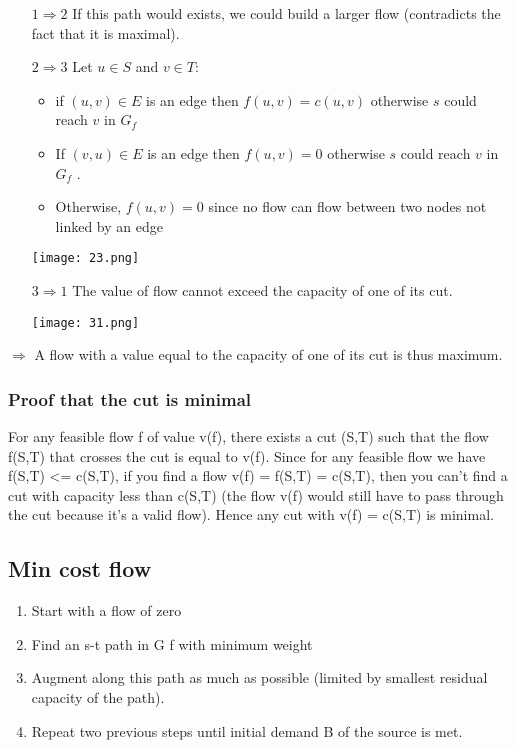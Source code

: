 \begin{itemize}
    \item[$1\Rightarrow2$] If this path would exists, we could build a
        larger flow (contradicts the fact that it is maximal).

    \item[$2\Rightarrow3$] Let $u \in S$ and $v\in T$:
        \begin{itemize}
            \item if $(u, v) \in E$ is an edge then $f(u, v) = c(u, v)$
                otherwise $s$ could reach $v$ in $G_f$ 
            \item If $(v, u) \in E$ is an edge then $f(u, v) = 0$
                otherwise $s$ could reach $v$ in $G_f$ .
            \item Otherwise, $f(u, v) = 0$ since no flow can flow between
                two nodes not linked by an edge
        \end{itemize}
        \begin{center}
    \texttt{[image: 23.png]}
    \end{center}

    \item[$3\Rightarrow1$] The value of flow cannot exceed the capacity of one of its
        cut.
        \begin{center}
    \texttt{[image: 31.png]}
    \end{center}
    \end{itemize}

$\Rightarrow$ A flow with a value equal to the capacity of one of its cut is thus
maximum.

\subsubsection{Proof that the cut is minimal}
For any feasible flow f of value v(f), there exists a cut (S,T) such
that the flow f(S,T) that crosses the cut is equal to v(f). Since for
any feasible flow we have f(S,T) <= c(S,T), if you find a flow v(f) =
f(S,T) = c(S,T), then you can't find a cut with capacity less than
c(S,T) (the flow v(f) would still have to pass through the cut because
it's a valid flow). Hence any cut with v(f) = c(S,T) is minimal.

\subsection{Min cost flow}
\begin{enumerate}
    \item Start with a flow of zero
    \item  Find an s-t path in G f with minimum weight
    \item  Augment along this path as much as possible (limited by
        smallest
        residual capacity of the path).
    \item  Repeat two previous steps until initial demand B of the source
        is met.
\end{enumerate}

